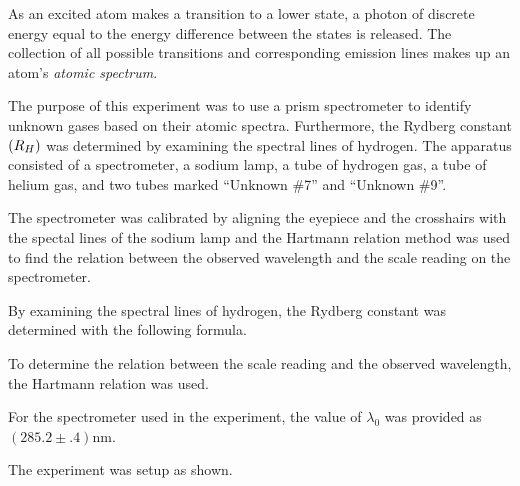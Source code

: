 \begin{paper}

As an excited atom makes a transition to a lower state, a photon of discrete energy equal to the energy difference between the states is released. The collection of all possible transitions and corresponding emission lines makes up an atom's \textit{atomic spectrum}.

The purpose of this experiment was to use a prism spectrometer to identify
unknown gases based on their atomic spectra.
Furthermore, the Rydberg constant $\left( R_H\right)$ was determined by examining the
spectral lines of hydrogen.
The apparatus consisted of a spectrometer, a sodium lamp, a tube of hydrogen
gas, a tube of helium gas, and two tubes marked ``Unknown
\#7'' and ``Unknown \#9''.

The spectrometer was calibrated by aligning the eyepiece and the crosshairs with the spectal lines of the sodium lamp and the Hartmann relation method was used to find the
relation between the observed wavelength and the scale reading on the
spectrometer.

By examining the spectral lines of hydrogen, the Rydberg constant was
determined with the following formula.

\begin{paperwhere}
\end{paperwhere}

To determine the relation between the scale reading and the
observed wavelength, the Hartmann relation was used.\columnbreak

\begin{paperwhere}
\end{paperwhere}

For the spectrometer used in the experiment, the value of $\lambda_0$ was
provided as $(285.2\pm.4)\si{\nano\meter}$.

The experiment was setup as shown.


\end{paper}
